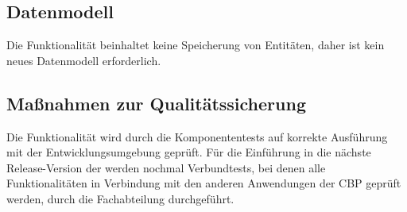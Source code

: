 \subsection{Datenmodell}
\label{sec:Datenmodell}

Die Funktionalität \gqq{\titel} beinhaltet keine Speicherung von Entitäten, daher ist kein neues Datenmodell erforderlich.


\subsection{Maßnahmen zur Qualitätssicherung}
\label{sec:Qualitaetssicherung}

Die Funktionalität  wird durch die Komponententests auf korrekte Ausführung mit der Entwicklungsumgebung geprüft. Für die Einführung in die nächste Release-Version der \CBPAD werden nochmal Verbundtests, bei denen alle Funktionalitäten in Verbindung mit den anderen Anwendungen der \acs{CBP}\xspace geprüft werden, durch die Fachabteilung durchgeführt.


